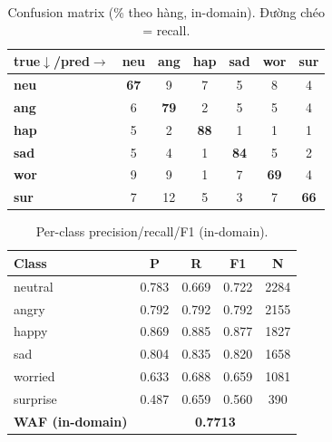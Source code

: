 \documentclass[10pt]{article}
\begin{document}
\begin{table}[H]\centering\footnotesize\setlength{\tabcolsep}{4pt}
\begin{tabular}{lcccccc}
\toprule
\textbf{true$\downarrow$/pred$\rightarrow$} & \textbf{neu} & \textbf{ang} & \textbf{hap} & \textbf{sad} & \textbf{wor} & \textbf{sur} \\
\midrule
\textbf{neu} & \cellcolor{cmblue!47}\textbf{67} & \cellcolor{cmblue!6}9 & \cellcolor{cmblue!5}7 & \cellcolor{cmblue!4}5 & \cellcolor{cmblue!6}8 & \cellcolor{cmblue!3}4 \\
\textbf{ang} & \cellcolor{cmblue!4}6 & \cellcolor{cmblue!55}\textbf{79} & \cellcolor{cmblue!1}2 & \cellcolor{cmblue!3}5 & \cellcolor{cmblue!3}5 & \cellcolor{cmblue!3}4 \\
\textbf{hap} & \cellcolor{cmblue!4}5 & \cellcolor{cmblue!2}2 & \cellcolor{cmblue!62}\textbf{88} & \cellcolor{cmblue!1}1 & \cellcolor{cmblue!1}1 & \cellcolor{cmblue!1}1 \\
\textbf{sad} & \cellcolor{cmblue!3}5 & \cellcolor{cmblue!3}4 & \cellcolor{cmblue!1}1 & \cellcolor{cmblue!58}\textbf{84} & \cellcolor{cmblue!4}5 & \cellcolor{cmblue!1}2 \\
\textbf{wor} & \cellcolor{cmblue!6}9 & \cellcolor{cmblue!6}9 & \cellcolor{cmblue!1}1 & \cellcolor{cmblue!5}7 & \cellcolor{cmblue!48}\textbf{69} & \cellcolor{cmblue!3}4 \\
\textbf{sur} & \cellcolor{cmblue!5}7 & \cellcolor{cmblue!9}12 & \cellcolor{cmblue!4}5 & \cellcolor{cmblue!2}3 & \cellcolor{cmblue!5}7 & \cellcolor{cmblue!46}\textbf{66} \\
\bottomrule
\end{tabular}
\caption{Confusion matrix (\% theo hàng, in-domain). Đường chéo = recall.}
\end{table}

\begin{table}[H]\centering\footnotesize
\begin{tabular}{lcccc}
\toprule
\textbf{Class} & \textbf{P} & \textbf{R} & \textbf{F1} & \textbf{N} \\
\midrule
neutral & 0.783 & 0.669 & 0.722 & 2284 \\
angry & 0.792 & 0.792 & 0.792 & 2155 \\
happy & 0.869 & 0.885 & 0.877 & 1827 \\
sad & 0.804 & 0.835 & 0.820 & 1658 \\
worried & 0.633 & 0.688 & 0.659 & 1081 \\
surprise & 0.487 & 0.659 & 0.560 & 390 \\
\midrule
\textbf{WAF (in-domain)} & \multicolumn{4}{c}{\textbf{0.7713}} \\
\bottomrule
\end{tabular}
\caption{Per-class precision/recall/F1 (in-domain).}
\end{table}
\end{document}
